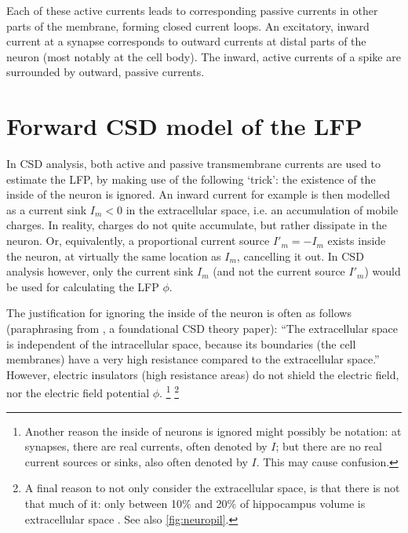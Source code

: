 
Each of these active currents leads to corresponding passive currents in other parts of the membrane, forming closed current loops. An excitatory, inward current at a synapse corresponds to outward currents at distal parts of the neuron (most notably at the cell body). The inward, active currents of a spike are surrounded by outward, passive currents.



\section{Forward CSD model of the LFP}
\label{sec:forward-CSD}

In CSD analysis, both active and passive transmembrane currents are used to estimate the LFP, by making use of the following `trick': the existence of the inside of the neuron is ignored. An inward current for example is then modelled as a current sink $I_m < 0$ in the extracellular space, i.e. an accumulation of mobile charges. In reality, charges do not quite accumulate, but rather dissipate in the neuron. Or, equivalently, a proportional current source $I'_m = -I_m$ exists inside the neuron, at virtually the same location as $I_m$, cancelling it out. In CSD analysis however, only the current sink $I_m$ (and not the current source $I'_m$) would be used for calculating the LFP $\phi$.

The justification for ignoring the inside of the neuron is often as follows (paraphrasing from \cite{Mitzdorf1985}, a foundational CSD theory paper): ``The extracellular space is independent of the intracellular space, because its boundaries (the cell membranes) have a very high resistance compared to the extracellular space.'' However, electric insulators (high resistance areas) do not shield the electric field, nor the electric field potential $\phi$.
%
\footnote{Another reason the inside of neurons is ignored might possibly be notation: at synapses, there are real currents, often denoted by $I$; but there are no real current sources or sinks, also often denoted by $I$. This may cause confusion.}
\footnote{A final reason to not only consider the extracellular space, is that there is not that much of it: only between 10\% and 20\% of hippocampus volume is extracellular space \cite{Sykova1997a}. See also \cref{fig:neuropil}.}

